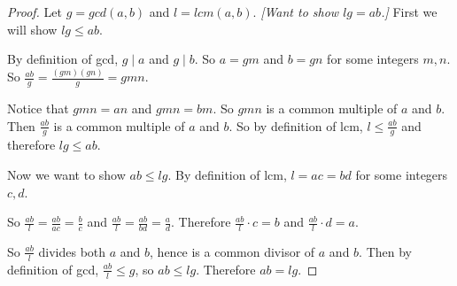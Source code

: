 \documentclass[14pt]{extarticle}
\newcommand{\dps}{\displaystyle}
\begin{document}
\begin{proof}
    Let $g = gcd(a,b)$ and $l = lcm(a,b)$. {\it [Want to show $lg = ab$.]} First we will show $lg \leq ab$.

    By definition of gcd, $g \mid a$ and $g \mid b$. So $a = gm$ and $b = gn$ for some integers $m,n$. So $\dps\frac{ab}{g} = \frac{(gm)(gn)}{g} = gmn$.

    Notice that $gmn = an$ and $gmn = bm$. So $gmn$ is a common multiple of $a$ and $b$. Then $\dps\frac{ab}{g}$ is a common multiple of $a$ and $b$. So by definition of lcm, $l \leq \dps\frac{ab}{g}$ and therefore $lg \leq ab$.

    Now we want to show $ab \leq lg$. By definition of lcm, $l = ac = bd$ for some integers $c,d$.

    So $\dps\frac{ab}{l} = \frac{ab}{ac} = \frac{b}{c}$ and $\dps\frac{ab}{l} = \frac{ab}{bd} = \frac{a}{d}$. Therefore $\dps\frac{ab}{l} \cdot c = b$ and $\dps\frac{ab}{l} \cdot d = a$.

    So $\dps\frac{ab}{l}$ divides both $a$ and $b$, hence is a common divisor of $a$ and $b$. Then by definition of gcd, $\dps\frac{ab}{l} \leq g$, so $ab \leq lg$. Therefore $ab = lg$.
\end{proof}
\end{document}
